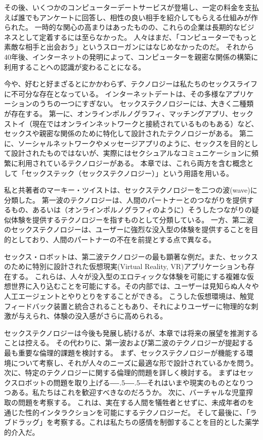 \documentclass[paper=a4,book,openany]{jlreq}
\def\DDASH{―\kern-.5\zw―\kern-.5\zw―} %
\begin{document}
その後、いくつかのコンピューターデートサービスが登場し、一定の料金を支払えば誰でもアンケートに回答し、相性の良い相手を紹介してもらえる仕組みが作られた。
一時的な関心の高まりはあったものの、これらの企業は長期的なビジネスとして定着するには至らなかった。
人々はまだ、「コンピューターでもっと素敵な相手と出会おう」というスローガンにはなじめなかったのだ。
それから40年後、インターネットの発明によって、コンピューターを親密な関係の構築に利用することへの認識が変わることになる。

今や、好むと好まざるとにかかわらず、テクノロジーは私たちのセックスライフに不可分な存在となっている。
インターネットデートは、その多様なアプリケーションのうちの一つにすぎない。
セックステクノロジーには、大きく二種類が存在する。
第一に、オンラインポルノグラフィ、マッチングアプリ、セックストイ（現在ではオンラインネットワークと接続されているものもある）など、セックスや親密な関係のために特化して設計されたテクノロジーがある。
第二に、ソーシャルネットワークやメッセージアプリのように、セックスを目的として設計されたものではないが、実際にはセクシュアルなコミュニケーションに頻繁に利用されているテクノロジーがある。
本章では、これら両方を含む概念として「セックステック（セックステクノロジー）」という用語を用いる。

私と共著者のマーキー・ツイストは、セックステクノロジーを二つの波(wave)に分類した\citep{mcarthur17:_rise_digis}。
第一波のテクノロジーは、人間のパートナーとのつながりを提供するもの、あるいは（オンラインポルノグラフィのように）そうしたつながりの疑似体験を提供するテクノロジーを指すものとして分類している。
一方、第二波のセックステクノロジーは、ユーザーに強烈な没入型の体験を提供することを目的としており、人間のパートナーの不在を前提とする点で異なる。

セックス・ロボットは、第二波テクノロジーの最も顕著な例だ。また、セックスのために特別に設計された仮想現実(Virtual Reality, VR)アプリケーションも存在する。
これらは、人々が没入型のエロティックな体験を可能にする複雑な仮想世界に入り込むことを可能にする。その内部では、ユーザーは見知らぬ人々や人工エージェントとやりとりをすることができる。
こうした仮想環境は、触覚フィードバック装置と統合されることもあり、それによりユーザーに物理的な刺激が与えられ、体験の没入感がさらに高められる。

セックステクノロジーは今後も発展し続けるが、本章では将来の展望を推測することは控える。
その代わりに、第一波および第二波のテクノロジーが提起する最も重要な倫理的課題を検討する。
まず、セックステクノロジーが機能する環境について考察し、それが人々のニーズに最適な形で設計されているかを問う。
次に、特定のテクノロジーに関する倫理的問題を詳しく検討する。
まずはセックスロボットの問題を取り上げる{\DDASH}それはいまや現実のものとなりつつある。私たちはこれを歓迎すべきなのだろうか。
次に、バーチャルな児童搾取の問題を考察する。
これは、実在する人間を犠牲者とせずに、未成年者のを通じた性的インタラクションを可能にするテクノロジーだ。
そして最後に、「ラブドラッグ」を考察する。これは私たちの感情を制御することを目的とした薬学的介入だ。
\end{document}
